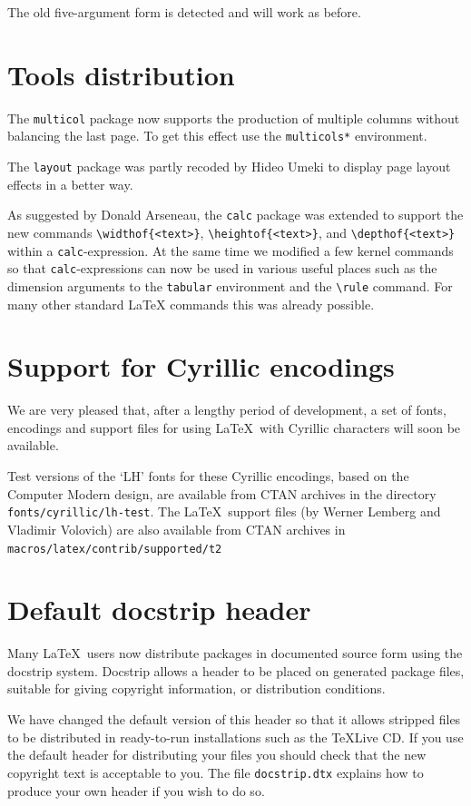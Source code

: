 \documentclass{ltnews}
\providecommand\pkg[1]{\texttt{#1}}
\providecommand\env[1]{\texttt{#1}}
\providecommand\file[1]{\texttt{#1}}
\begin{document}
The old five-argument form is detected and will work as before.

\newpage

\section{Tools distribution}

The \pkg{multicol} package now supports the production of multiple
columns without balancing the last page. To get this effect use the
\env{multicols*} environment.

The \pkg{layout} package was partly recoded by Hideo Umeki to
display page layout effects in a better way.

As suggested by Donald Arseneau, the \pkg{calc} package was extended
to support the new commands \verb|\widthof{<text>}|,
\verb|\heightof{<text>}|, and \verb|\depthof{<text>}| within a
\pkg{calc}-expression.  At the same time we modified a few kernel
commands so that \pkg{calc}-expressions can now be used in various
useful places such as the dimension arguments to the \env{tabular}
environment and the \verb|\rule| command. For many other standard
\LaTeX{} commands this was already possible.


\section{Support for Cyrillic encodings}

We are very pleased that, after a lengthy period of development, a set
of fonts, encodings and support files for using \LaTeX\ with Cyrillic
characters will soon be available.

Test versions of the `LH' fonts for these Cyrillic encodings, based on
the Computer Modern design, are available from CTAN archives in the
directory \file{fonts/cyrillic/lh-test}.  The \LaTeX\ support files
(by Werner Lemberg and Vladimir Volovich) are also available from CTAN
archives in\\
 \file{macros/latex/contrib/supported/t2}


\section{Default docstrip header}

Many \LaTeX\ users now distribute packages in documented source form
using the \textsf{docstrip} system. Docstrip allows a header to be
placed on generated package files, suitable for giving copyright
information, or distribution conditions.

We have changed the default version of this header so that it allows
stripped files to be distributed in ready-to-run installations such as
the \TeX{}Live CD\@.  If you use the default header for distributing
your files you should check that the new copyright text is acceptable
to you.  The file \file{docstrip.dtx} explains how to produce your own
header if you wish to do so.
\end{document}
